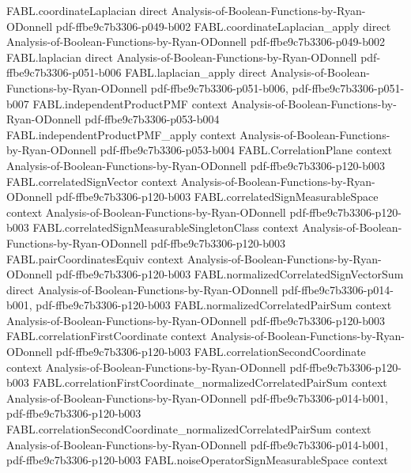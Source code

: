 \begin{theorem}
\proofstep
  {FABL.coordinateLaplacian}
  {direct}
  {Analysis-of-Boolean-Functions-by-Ryan-ODonnell}
  {pdf-ffbe9c7b3306-p049-b002}
\proofstep
  {FABL.coordinateLaplacian_apply}
  {direct}
  {Analysis-of-Boolean-Functions-by-Ryan-ODonnell}
  {pdf-ffbe9c7b3306-p049-b002}
\proofstep
  {FABL.laplacian}
  {direct}
  {Analysis-of-Boolean-Functions-by-Ryan-ODonnell}
  {pdf-ffbe9c7b3306-p051-b006}
\proofstep
  {FABL.laplacian_apply}
  {direct}
  {Analysis-of-Boolean-Functions-by-Ryan-ODonnell}
  {pdf-ffbe9c7b3306-p051-b006,
    pdf-ffbe9c7b3306-p051-b007}
\proofstep
  {FABL.independentProductPMF}
  {context}
  {Analysis-of-Boolean-Functions-by-Ryan-ODonnell}
  {pdf-ffbe9c7b3306-p053-b004}
\proofstep
  {FABL.independentProductPMF_apply}
  {context}
  {Analysis-of-Boolean-Functions-by-Ryan-ODonnell}
  {pdf-ffbe9c7b3306-p053-b004}
\proofstep
  {FABL.CorrelationPlane}
  {context}
  {Analysis-of-Boolean-Functions-by-Ryan-ODonnell}
  {pdf-ffbe9c7b3306-p120-b003}
\proofstep
  {FABL.correlatedSignVector}
  {context}
  {Analysis-of-Boolean-Functions-by-Ryan-ODonnell}
  {pdf-ffbe9c7b3306-p120-b003}
\proofstep
  {FABL.correlatedSignMeasurableSpace}
  {context}
  {Analysis-of-Boolean-Functions-by-Ryan-ODonnell}
  {pdf-ffbe9c7b3306-p120-b003}
\proofstep
  {FABL.correlatedSignMeasurableSingletonClass}
  {context}
  {Analysis-of-Boolean-Functions-by-Ryan-ODonnell}
  {pdf-ffbe9c7b3306-p120-b003}
\proofstep
  {FABL.pairCoordinatesEquiv}
  {context}
  {Analysis-of-Boolean-Functions-by-Ryan-ODonnell}
  {pdf-ffbe9c7b3306-p120-b003}
\proofstep
  {FABL.normalizedCorrelatedSignVectorSum}
  {direct}
  {Analysis-of-Boolean-Functions-by-Ryan-ODonnell}
  {pdf-ffbe9c7b3306-p014-b001,
    pdf-ffbe9c7b3306-p120-b003}
\proofstep
  {FABL.normalizedCorrelatedPairSum}
  {context}
  {Analysis-of-Boolean-Functions-by-Ryan-ODonnell}
  {pdf-ffbe9c7b3306-p120-b003}
\proofstep
  {FABL.correlationFirstCoordinate}
  {context}
  {Analysis-of-Boolean-Functions-by-Ryan-ODonnell}
  {pdf-ffbe9c7b3306-p120-b003}
\proofstep
  {FABL.correlationSecondCoordinate}
  {context}
  {Analysis-of-Boolean-Functions-by-Ryan-ODonnell}
  {pdf-ffbe9c7b3306-p120-b003}
\proofstep
  {FABL.correlationFirstCoordinate_normalizedCorrelatedPairSum}
  {context}
  {Analysis-of-Boolean-Functions-by-Ryan-ODonnell}
  {pdf-ffbe9c7b3306-p014-b001,
    pdf-ffbe9c7b3306-p120-b003}
\proofstep
  {FABL.correlationSecondCoordinate_normalizedCorrelatedPairSum}
  {context}
  {Analysis-of-Boolean-Functions-by-Ryan-ODonnell}
  {pdf-ffbe9c7b3306-p014-b001,
    pdf-ffbe9c7b3306-p120-b003}
\proofstep
  {FABL.noiseOperatorSignMeasurableSpace}
  {context}

\end{theorem}
